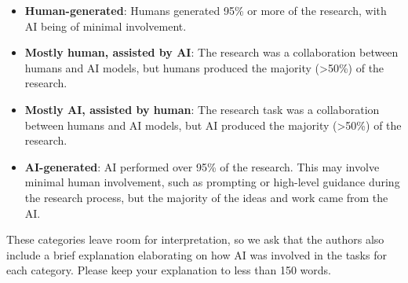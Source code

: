 \documentclass{article}
\begin{document}
\begin{itemize}
    \item \involvementA{} \textbf{Human-generated}: Humans generated 95\% or more of the research, with AI being of minimal involvement.
    \item \involvementB{} \textbf{Mostly human, assisted by AI}: The research was a collaboration between humans and AI models, but humans produced the majority (>50\%) of the research.
    \item \involvementC{} \textbf{Mostly AI, assisted by human}: The research task was a collaboration between humans and AI models, but AI produced the majority (>50\%) of the research.
    \item \involvementD{} \textbf{AI-generated}: AI performed over 95\% of the research. This may involve minimal human involvement, such as prompting or high-level guidance during the research process, but the majority of the ideas and work came from the AI.
\end{itemize}

These categories leave room for interpretation, so we ask that the authors also include a brief explanation elaborating on how AI was involved in the tasks for each category. Please keep your explanation to less than 150 words.
\end{document}
